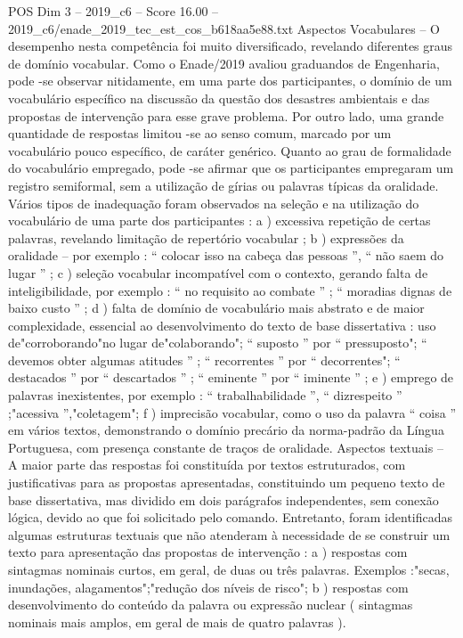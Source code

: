\begin{textsample}{POS Dim 3 – 2019\_c6 – Score 16.00 – 2019\_c6/enade\_2019\_tec\_est\_cos\_b618aa5e88.txt}
Aspectos Vocabulares – O desempenho nesta competência foi muito diversificado, revelando diferentes graus de domínio vocabular.
Como o Enade/2019 avaliou graduandos de Engenharia, pode -se observar nitidamente, em uma parte dos participantes, o domínio de um vocabulário específico na discussão da questão dos desastres ambientais e das propostas de intervenção para esse grave problema.
Por outro lado, uma grande quantidade de respostas limitou -se ao senso comum, marcado por um vocabulário pouco específico, de caráter genérico.
Quanto ao grau de formalidade do vocabulário empregado, pode -se afirmar que os participantes empregaram um registro semiformal, sem a utilização de gírias ou palavras típicas da oralidade.
Vários tipos de inadequação foram observados na seleção e na utilização do vocabulário de uma parte dos participantes : a ) excessiva repetição de certas palavras, revelando limitação de repertório vocabular ; b ) expressões da oralidade – por exemplo : “ colocar isso na cabeça das pessoas ”, “ não saem do lugar ” ; c ) seleção vocabular incompatível com o contexto, gerando falta de inteligibilidade, por exemplo : “ no requisito ao combate ” ; “ moradias dignas de baixo custo ” ; d ) falta de domínio de vocabulário mais abstrato e de maior complexidade, essencial ao desenvolvimento do texto de base dissertativa : uso de"corroborando"no lugar de"colaborando"; “ suposto ” por “ pressuposto"; “ devemos obter algumas atitudes ” ; “ recorrentes ” por “ decorrentes"; “ destacados ” por “ descartados ” ; “ eminente ” por “ iminente ” ; e ) emprego de palavras inexistentes, por exemplo : “ trabalhabilidade ”, “ dizrespeito ” ;"acessiva ”,"coletagem"; f ) imprecisão vocabular, como o uso da palavra “ coisa ” em vários textos, demonstrando o domínio precário da norma-padrão da Língua Portuguesa, com presença constante de traços de oralidade.
Aspectos textuais – A maior parte das respostas foi constituída por textos estruturados, com justificativas para as propostas apresentadas, constituindo um pequeno texto de base dissertativa, mas dividido em dois parágrafos independentes, sem conexão lógica, devido ao que foi solicitado pelo comando.
Entretanto, foram identificadas algumas estruturas textuais que não atenderam à necessidade de se construir um texto para apresentação das propostas de intervenção : a ) respostas com sintagmas nominais curtos, em geral, de duas ou três palavras.
Exemplos :"secas, inundações, alagamentos";"redução dos níveis de risco"; b ) respostas com desenvolvimento do conteúdo da palavra ou expressão nuclear ( sintagmas nominais mais amplos, em geral de mais de quatro palavras ).

\end{textsample}
